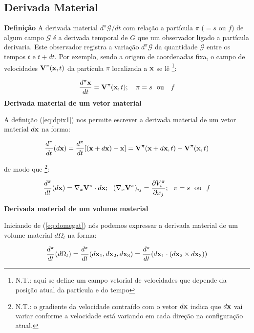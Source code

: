 \documentclass[
	11pt, %
	fleqn, %
	a4paper, %
]{LegrandOrangeBook}
\begin{document}
\subsection{Derivada Material}
\textbf{Definição}
A derivada material $d^\pi \mathcal{G}/dt$ com relação a partícula $\pi$ ($=s$ ou $f$) de algum campo $\mathcal{G}$ é a derivada temporal de $G$ que um observador ligado a partícula derivaria. Este observador registra a variação $d^\pi\mathcal{G}$ da quantidade $\mathcal{G}$ entre os tempos $t$ e $t+dt$. Por exemplo, sendo a origem de coordenadas fixa, o campo de velocidades $\textbf{V}^\pi(\textbf{x},t)$ da partícula $\pi$ localizada a $\textbf{x}$ se lê \footnote{N.T.: aqui se define um campo vetorial de velocidades que depende da posição atual da partícula e do tempo}:

\begin{equation}
	\label{eq:dpix1}	
	\dfrac{d^\pi\textbf{x}}{dt} = \textbf{V}^\pi(\textbf{x},t); ~~~ \pi = s ~~\text{ou} ~~~f
\end{equation}
\textbf{Derivada material de um vetor material}

A definição (\ref{eq:dpix1}) nos permite escrever a derivada material de um vetor material $d\textbf{x}$ na forma:

\begin{equation}
	\label{eq:dpix2}	
	\dfrac{d^\pi}{dt}(d\textbf{x}) = \dfrac{d^\pi}{dt}[(\textbf{x}+d\textbf{x})-\textbf{x}]=\textbf{V}^\pi(\textbf{x}+d\textbf{x},t)- \textbf{V}^\pi(\textbf{x},t) 
\end{equation}

de modo que \footnote{N.T.: o gradiente da velocidade contraído com o vetor $d\textbf{x}$ indica que $d\textbf{x}$ vai variar conforme a velocidade está variando em cada direção na configuração atual.}:

\begin{equation}
	\label{eq:dpix3}	
	\dfrac{d^\pi}{dt}(d\textbf{x}) = \nabla_x\textbf{V}^\pi \cdot d\textbf{x}; ~~ (\nabla_x \textbf{V}^\pi)_{ij} = \dfrac{\partial V_i^\pi}{\partial x_j}; ~~ \pi = s ~~ \text{ou} ~~ f
\end{equation}

\textbf{Derivada material de um volume material}

Iniciando de (\ref{eq:domegat}) nós podemos expressar a derivada material de um volume material $d\Omega_t$ na forma:

\begin{equation}
	\label{eq:derivadavolumematerial}	
	\dfrac{d^\pi}{dt}(d\Omega_t) = \dfrac{d^\pi}{dt}(d\textbf{x}_1,d\textbf{x}_2,d\textbf{x}_3) = \dfrac{d^\pi}{dt}(d\textbf{x}_1\cdot (d\textbf{x}_2 \times d\textbf{x}_3))
\end{equation}
\end{document}
